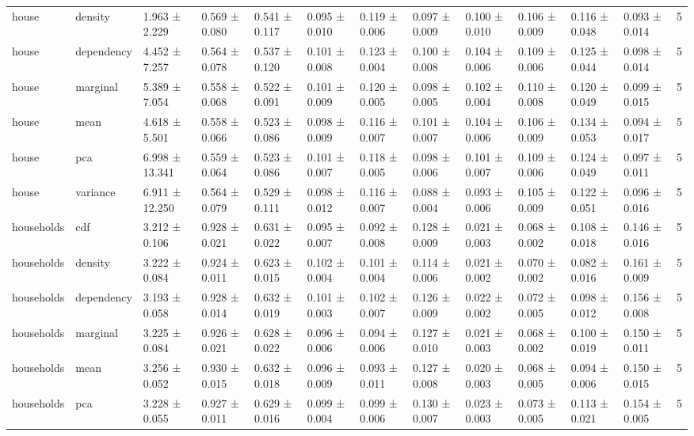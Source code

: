 \begin{table}
\begin{tabular}{llllllllllllr}
house & density & 1.963 ± 2.229 & 0.569 ± 0.080 & 0.541 ± 0.117 & 0.095 ± 0.010 & 0.119 ± 0.006 & 0.097 ± 0.009 & 0.100 ± 0.010 & 0.106 ± 0.009 & 0.116 ± 0.048 & 0.093 ± 0.014 & 5 \\
house & dependency & 4.452 ± 7.257 & 0.564 ± 0.078 & 0.537 ± 0.120 & 0.101 ± 0.008 & 0.123 ± 0.004 & 0.100 ± 0.008 & 0.104 ± 0.006 & 0.109 ± 0.006 & 0.125 ± 0.044 & 0.098 ± 0.014 & 5 \\
house & marginal & 5.389 ± 7.054 & 0.558 ± 0.068 & 0.522 ± 0.091 & 0.101 ± 0.009 & 0.120 ± 0.005 & 0.098 ± 0.005 & 0.102 ± 0.004 & 0.110 ± 0.008 & 0.120 ± 0.049 & 0.099 ± 0.015 & 5 \\
house & mean & 4.618 ± 5.501 & 0.558 ± 0.066 & 0.523 ± 0.086 & 0.098 ± 0.009 & 0.116 ± 0.007 & 0.101 ± 0.007 & 0.104 ± 0.006 & 0.106 ± 0.009 & 0.134 ± 0.053 & 0.094 ± 0.017 & 5 \\
house & pca & 6.998 ± 13.341 & 0.559 ± 0.064 & 0.523 ± 0.086 & 0.101 ± 0.007 & 0.118 ± 0.005 & 0.098 ± 0.006 & 0.101 ± 0.007 & 0.109 ± 0.006 & 0.124 ± 0.049 & 0.097 ± 0.011 & 5 \\
house & variance & 6.911 ± 12.250 & 0.564 ± 0.079 & 0.529 ± 0.111 & 0.098 ± 0.012 & 0.116 ± 0.007 & 0.088 ± 0.004 & 0.093 ± 0.006 & 0.105 ± 0.009 & 0.122 ± 0.051 & 0.096 ± 0.016 & 5 \\
households & cdf & 3.212 ± 0.106 & 0.928 ± 0.021 & 0.631 ± 0.022 & 0.095 ± 0.007 & 0.092 ± 0.008 & 0.128 ± 0.009 & 0.021 ± 0.003 & 0.068 ± 0.002 & 0.108 ± 0.018 & 0.146 ± 0.016 & 5 \\
households & density & 3.222 ± 0.084 & 0.924 ± 0.011 & 0.623 ± 0.015 & 0.102 ± 0.004 & 0.101 ± 0.004 & 0.114 ± 0.006 & 0.021 ± 0.002 & 0.070 ± 0.002 & 0.082 ± 0.016 & 0.161 ± 0.009 & 5 \\
households & dependency & 3.193 ± 0.058 & 0.928 ± 0.014 & 0.632 ± 0.019 & 0.101 ± 0.003 & 0.102 ± 0.007 & 0.126 ± 0.009 & 0.022 ± 0.002 & 0.072 ± 0.005 & 0.098 ± 0.012 & 0.156 ± 0.008 & 5 \\
households & marginal & 3.225 ± 0.084 & 0.926 ± 0.021 & 0.628 ± 0.022 & 0.096 ± 0.006 & 0.094 ± 0.006 & 0.127 ± 0.010 & 0.021 ± 0.003 & 0.068 ± 0.002 & 0.100 ± 0.019 & 0.150 ± 0.011 & 5 \\
households & mean & 3.256 ± 0.052 & 0.930 ± 0.015 & 0.632 ± 0.018 & 0.096 ± 0.009 & 0.093 ± 0.011 & 0.127 ± 0.008 & 0.020 ± 0.003 & 0.068 ± 0.005 & 0.094 ± 0.006 & 0.150 ± 0.015 & 5 \\
households & pca & 3.228 ± 0.055 & 0.927 ± 0.011 & 0.629 ± 0.016 & 0.099 ± 0.004 & 0.099 ± 0.006 & 0.130 ± 0.007 & 0.023 ± 0.003 & 0.073 ± 0.005 & 0.113 ± 0.021 & 0.154 ± 0.005 & 5 \\

\end{tabular}
\end{table}
